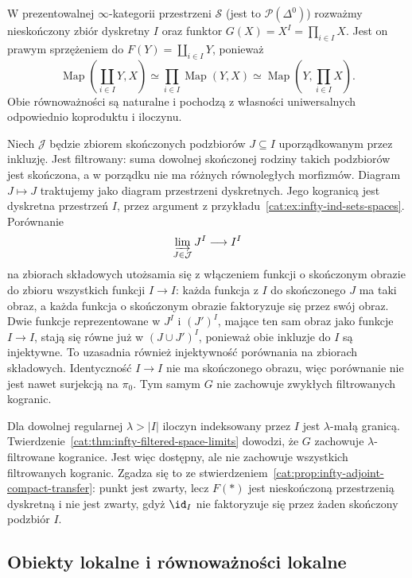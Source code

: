 \begin{przyklad}\label{cat:ex:infty-adjoint-not-finitary}
W prezentowalnej $\infty$-kategorii przestrzeni $\mathcal S$ (jest to $\mathcal P(\Delta^0)$) rozważmy nieskończony zbiór dyskretny $I$ oraz funktor $G(X)=X^I=\prod_{i\in I}X$. Jest on prawym sprzężeniem do $F(Y)=\coprod_{i\in I}Y$, ponieważ
\[
 \operatorname{Map}(\coprod_{i\in I}Y,X)
 \simeq\prod_{i\in I}\operatorname{Map}(Y,X)
 \simeq\operatorname{Map}(Y,\prod_{i\in I}X).
\]
Obie równoważności są naturalne i pochodzą z własności uniwersalnych odpowiednio koproduktu i iloczynu.

Niech $\mathcal J$ będzie zbiorem skończonych podzbiorów $J\subseteq I$ uporządkowanym przez inkluzję. Jest filtrowany: suma dowolnej skończonej rodziny takich podzbiorów jest skończona, a w porządku nie ma różnych równoległych morfizmów. Diagram $J\mapsto J$ traktujemy jako diagram przestrzeni dyskretnych. Jego kogranicą jest dyskretna przestrzeń $I$, przez argument z przykładu~\ref{cat:ex:infty-ind-sets-spaces}. Porównanie
\[
 \varinjlim_{J\in\mathcal J}J^I\longrightarrow I^I
\]
na zbiorach składowych utożsamia się z włączeniem funkcji o skończonym obrazie do zbioru wszystkich funkcji $I\to I$: każda funkcja z $I$ do skończonego $J$ ma taki obraz, a każda funkcja o skończonym obrazie faktoryzuje się przez swój obraz. Dwie funkcje reprezentowane w $J^I$ i $(J')^I$, mające ten sam obraz jako funkcje $I\to I$, stają się równe już w $(J\cup J')^I$, ponieważ obie inkluzje do $I$ są injektywne. To uzasadnia również injektywność porównania na zbiorach składowych. Identyczność $I\to I$ nie ma skończonego obrazu, więc porównanie nie jest nawet surjekcją na $\pi_0$. Tym samym $G$ nie zachowuje zwykłych filtrowanych kogranic.

Dla dowolnej regularnej $\lambda>|I|$ iloczyn indeksowany przez $I$ jest $\lambda$-małą granicą. Twierdzenie~\ref{cat:thm:infty-filtered-space-limits} dowodzi, że $G$ zachowuje $\lambda$-filtrowane kogranice. Jest więc dostępny, ale nie zachowuje wszystkich filtrowanych kogranic. Zgadza się to ze stwierdzeniem~\ref{cat:prop:infty-adjoint-compact-transfer}: punkt jest zwarty, lecz $F(*)$ jest nieskończoną przestrzenią dyskretną i nie jest zwarty, gdyż $\id_I$ nie faktoryzuje się przez żaden skończony podzbiór $I$.
\end{przyklad}

\subsection{Obiekty lokalne i równoważności lokalne}

